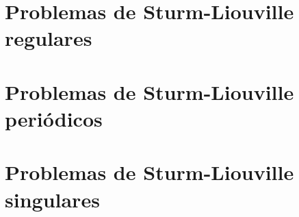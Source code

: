   \section[ slide = true ]{Problemas de Sturm-Liouville regulares}
   
   \section[ slide = true ]{Problemas de Sturm-Liouville periódicos}
   
   \section[ slide = true ]{Problemas de Sturm-Liouville singulares}
      
	
